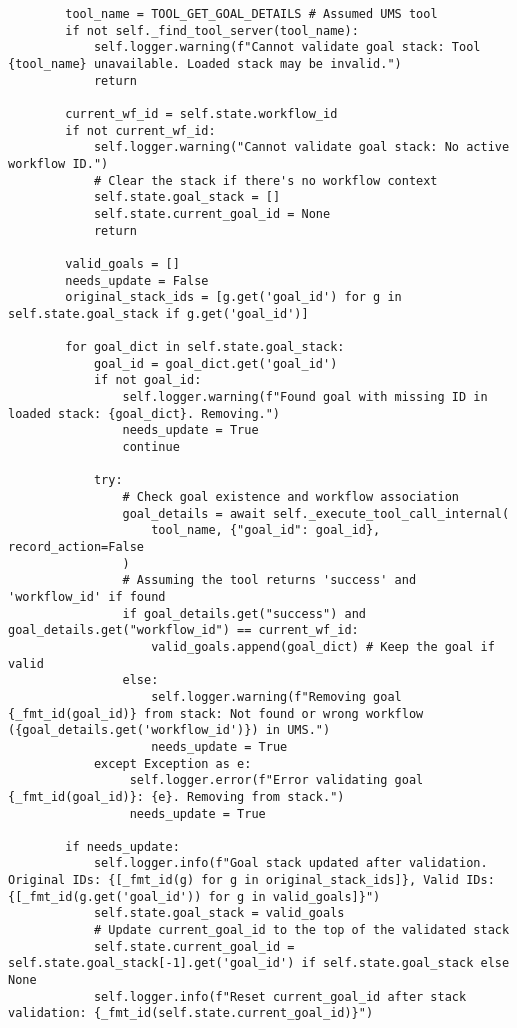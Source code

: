 \documentclass[12pt,a4paper]{article}
\begin{document}
\begin{pageablecode}
\begin{verbatim}
        tool_name = TOOL_GET_GOAL_DETAILS # Assumed UMS tool
        if not self._find_tool_server(tool_name):
            self.logger.warning(f"Cannot validate goal stack: Tool {tool_name} unavailable. Loaded stack may be invalid.")
            return

        current_wf_id = self.state.workflow_id
        if not current_wf_id:
            self.logger.warning("Cannot validate goal stack: No active workflow ID.")
            # Clear the stack if there's no workflow context
            self.state.goal_stack = []
            self.state.current_goal_id = None
            return

        valid_goals = []
        needs_update = False
        original_stack_ids = [g.get('goal_id') for g in self.state.goal_stack if g.get('goal_id')]

        for goal_dict in self.state.goal_stack:
            goal_id = goal_dict.get('goal_id')
            if not goal_id:
                self.logger.warning(f"Found goal with missing ID in loaded stack: {goal_dict}. Removing.")
                needs_update = True
                continue

            try:
                # Check goal existence and workflow association
                goal_details = await self._execute_tool_call_internal(
                    tool_name, {"goal_id": goal_id}, record_action=False
                )
                # Assuming the tool returns 'success' and 'workflow_id' if found
                if goal_details.get("success") and goal_details.get("workflow_id") == current_wf_id:
                    valid_goals.append(goal_dict) # Keep the goal if valid
                else:
                    self.logger.warning(f"Removing goal {_fmt_id(goal_id)} from stack: Not found or wrong workflow ({goal_details.get('workflow_id')}) in UMS.")
                    needs_update = True
            except Exception as e:
                 self.logger.error(f"Error validating goal {_fmt_id(goal_id)}: {e}. Removing from stack.")
                 needs_update = True

        if needs_update:
            self.logger.info(f"Goal stack updated after validation. Original IDs: {[_fmt_id(g) for g in original_stack_ids]}, Valid IDs: {[_fmt_id(g.get('goal_id')) for g in valid_goals]}")
            self.state.goal_stack = valid_goals
            # Update current_goal_id to the top of the validated stack
            self.state.current_goal_id = self.state.goal_stack[-1].get('goal_id') if self.state.goal_stack else None
            self.logger.info(f"Reset current_goal_id after stack validation: {_fmt_id(self.state.current_goal_id)}")


\end{verbatim}
\end{pageablecode}
\end{document}
